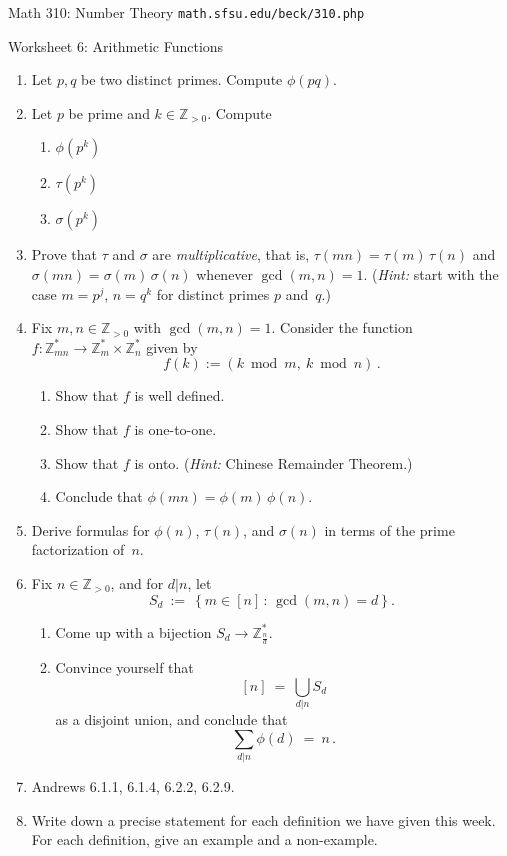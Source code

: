 \documentclass[11pt]{article}
\def\Z{\mathbb{Z}}
\begin{document}
\setlength{\parindent}{0pt}
\setlength{\parskip}{0.2cm}

{ Math 310: Number Theory}
\hfill
{\tt math.sfsu.edu/beck/310.php}

\vspace{.3in}

\begin{center}
\Large{Worksheet 6: Arithmetic Functions}
\end{center}

\begin{enumerate}

\item Let $p, q$ be two distinct primes. Compute $\phi(pq)$.

\item Let $p$ be prime and $k \in \Z_{ >0 }$. Compute
\begin{enumerate}
  \item $\phi(p^k)$
  \item $\tau(p^k)$
  \item $\sigma(p^k)$
\end{enumerate} 

\item Prove that $\tau$ and $\sigma$ are \emph{multiplicative}, that is, $\tau(mn) = \tau(m) \, \tau(n)$ and
$\sigma(mn) = \sigma(m) \, \sigma(n)$ whenever $\gcd(m,n) = 1$.
(\emph{Hint:} start with the case $m = p^j$, $n = q^k$ for distinct primes $p$ and~$q$.)

\item Fix $m, n \in \Z_{ >0 }$ with $\gcd(m,n) = 1$.
Consider the function $f: \Z_{ mn }^* \to \Z_m^* \times \Z_n^*$ given by
\[
  f(k) := (k \bmod m, \ k \bmod n) \, .
\]
\begin{enumerate}
  \item Show that $f$ is well defined.
  \item Show that $f$ is one-to-one.
  \item Show that $f$ is onto. (\emph{Hint:} Chinese Remainder Theorem.)
  \item Conclude that $\phi(mn) = \phi(m) \, \phi(n)$.
\end{enumerate} 

\item Derive formulas for $\phi(n)$, $\tau(n)$, and $\sigma(n)$ in terms of the prime factorization of~$n$.

\item Fix $n \in \Z_{ >0 }$, and for $d|n$, let
\[
  S_d \ := \ \left\{ m \in [n] \, : \, \gcd(m,n) = d \right\} .
\]
\begin{enumerate}
  \item Come up with a bijection $S_d \to \Z_{ \frac n d }^*$.
  \item Convince yourself that
  \[
    [n] \ = \ \bigcup_{ d|n } S_d
  \]
  as a disjoint union, and conclude that
  \[
    \sum_{ d|n } \phi(d) \ = \ n \, .
  \]
\end{enumerate} 

\item Andrews 6.1.1, 6.1.4, 6.2.2, 6.2.9.
 
\item Write down a precise statement for each definition we have given this week.
For each definition, give an example and a non-example.

\end{enumerate}
\end{document}
